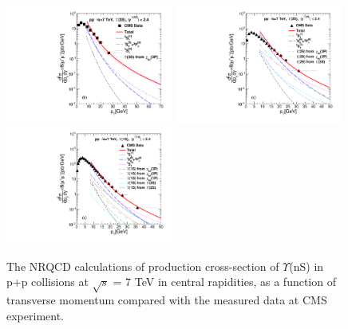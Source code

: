 \begin{figure}
  \centering
  \includegraphics[width=0.49\textwidth]{Figures/NRQCD_Beauty/Fig2b_Y3S_CMS_Rapl24.pdf}
  \includegraphics[width=0.49\textwidth]{Figures/NRQCD_Beauty/Fig5c_CMS_D2NDPtDy_Y2S_Y0024_Pt.pdf}
  \includegraphics[width=0.49\textwidth]{Figures/NRQCD_Beauty/Fig7c_CMS_D2NDPtDy_Y1S_Y0024_Pt.pdf}
  \caption{\small{The NRQCD calculations of production cross-section of $\Upsilon$(nS) in p+p collisions at 
      $\sqrt{s}$ = 7 TeV in central rapidities, as a function of transverse momentum compared with the measured data 
      at CMS~\cite{Chatrchyan:2013yna} experiment.}}
  \label{Fig:SigmaYnSCMS7TeV}
\end{figure}


